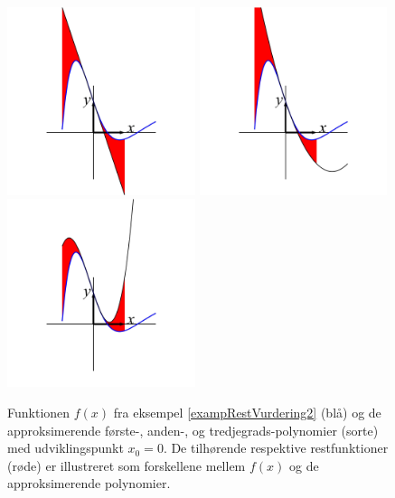 \begin{figure}[ht]
\centerline{\includegraphics[height=55mm]{plotAp1.pdf} \includegraphics[height=55mm]{plotAp2.pdf} \includegraphics[height=55mm]{plotAp3.pdf}   }
\begin{center}
\caption{Funktionen $f(x)$ fra eksempel \ref{exampRestVurdering2} (blå) og de approksimerende første-, anden-, og tredjegrads-polynomier (sorte) med udviklingspunkt $x_{0}=0$. De tilhørende respektive restfunktioner (røde) er illustreret som forskellene mellem $f(x)$ og de approksimerende polynomier.} \label{figAp3}
\end{center}
\end{figure}




